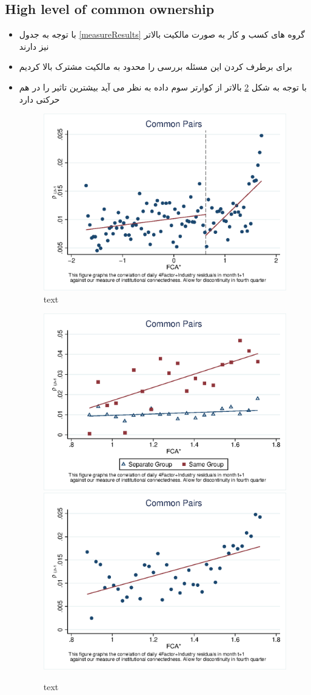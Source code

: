 \documentclass[12pt, a4paper]{article}
\begin{document}
\subsection{High level of common ownership}
\begin{itemize}
	\item 
	با توجه به جدول 
	\ref{measureResults}
	گروه های کسب و کار به صورت مالکیت بالاتر نیز دارند 
	\item
	برای برطرف کردن این مسئله بررسی را محدود به مالکیت مشترک بالا کردیم
	\item
	با توجه به شکل 
	\ref{Qmcorr5subsample}
	بالاتر از کوارتر سوم داده به نظر می آید بیشترین تاثیر را در هم حرکتی دارد
	
	\begin{figure}[htbp]
		\centering  
		\includegraphics[width=0.6\linewidth]{"Output/Qmcorr5lrd.eps"}
		\caption{text}
		\label{Qmcorr5lrd}
	\end{figure}
	\begin{figure}[htbp]
		\centering  
		\includegraphics[width=0.45\linewidth]{"Output/Qmcorr5lrdbgsubsample.eps"}
		\includegraphics[width=0.45\linewidth]{"Output/Qmcorr5subsample.eps"}
		\caption{text}
		\label{Qmcorr5subsample}
	\end{figure}


\end{itemize}
\end{document}

